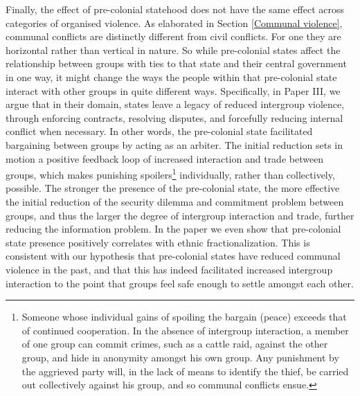Finally, the effect of pre-colonial statehood does not have the same effect
across categories of organised violence. As elaborated in Section \ref{Communal
violence}, communal conflicts are distinctly different from civil conflicts. For
one they are horizontal rather than vertical in nature. So while pre-colonial
states affect the relationship between groups with ties to that state and their
central government in one way, it might change the ways the people within that
pre-colonial state interact with other groups in quite different ways.
Specifically, in Paper III, we argue that in their domain, states leave a legacy
of reduced intergroup violence, through enforcing contracts, resolving disputes,
and forcefully reducing internal conflict when necessary. In other words, the
pre-colonial state facilitated bargaining between groups by acting as an
arbiter. The initial reduction sets in motion a positive feedback loop of
increased interaction and trade between groups, which makes punishing
spoilers\footnote{Someone whose individual gains of spoiling the bargain (peace)
	exceeds that of continued cooperation. In the absence of intergroup
	interaction, a member of one group can commit crimes, such as a cattle
	raid, against the other group, and hide in anonymity amongst his own
	group. Any punishment by the aggrieved party will, in the lack of means
	to identify the thief, be carried out collectively against his group,
and so communal conflicts ensue.} individually, rather than collectively,
possible. The stronger the presence of the pre-colonial state, the more
effective the initial reduction of the security dilemma and commitment problem
between groups, and thus the larger the degree of intergroup interaction and
trade, further reducing the information problem. In the paper we even show that
pre-colonial state presence positively correlates with ethnic fractionalization.
This is consistent with our hypothesis that pre-colonial states have reduced
communal violence in the past, and that this has indeed facilitated increased
intergroup interaction to the point that groups feel safe enough to settle
amongst each other.

%

